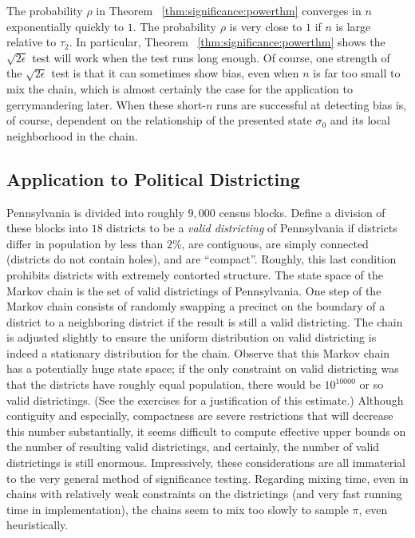 \documentclass[12pt]{article}
\begin{document}
\begin{remark}
    The probability \( \rho \) in Theorem~%
    \ref{thm:significance:powerthm} converges in \( n \) exponentially
    quickly to \( 1 \).  The probability \( \rho \) is very close to \( 1
    \) if \( n \) is large relative to \( \tau_2 \).  In particular,
    Theorem~%
    \ref{thm:significance:powerthm} shows the \( \sqrt{2\epsilon} \) test
    will work when the test runs long enough.  Of course, one strength
    of the \( \sqrt{2\epsilon} \) test is that it can sometimes show
    bias, even when \( n \) is far too small to mix the chain, which is
    almost certainly the case for the application to gerrymandering
    later.  When these short-\( n \) runs are successful at detecting
    bias is, of course, dependent on the relationship of the presented
    state \( \sigma_0 \) and its local neighborhood in the chain.
\end{remark}

\subsection*{Application to Political Districting}

Pennsylvania is divided into roughly \( 9,000 \) census blocks.  Define
a division of these blocks into \( 18 \) districts to be a \emph{valid
districting} of Pennsylvania if districts differ in population by less
than \( 2\% \), are contiguous, are simply connected (districts do not
contain holes), and are ``compact''.  Roughly, this last condition
prohibits districts with extremely contorted structure.  The state space
of the Markov chain is the set of valid districtings of Pennsylvania.
One step of the Markov chain consists of randomly swapping a precinct on
the boundary of a district to a neighboring district if the result is
still a valid districting.  The chain is adjusted slightly to ensure the
uniform distribution on valid districting is indeed a stationary
distribution for the chain.  Observe that this Markov chain has a
potentially huge state space; if the only constraint on valid
districting was that the districts have roughly equal population, there
would be \( 10^{10000} \) or so valid districtings.  (See the exercises
for a justification of this estimate.) Although contiguity and
especially, compactness are severe restrictions that will decrease this
number substantially, it seems difficult to compute effective upper
bounds on the number of resulting valid districtings, and certainly, the
number of valid districtings is still enormous.  Impressively, these
considerations are all immaterial to the very general method of
significance testing.  Regarding mixing time, even in chains with
relatively weak constraints on the districtings (and very fast running
time in implementation), the chains seem to mix too slowly to sample \( \pi \),
even heuristically.
\end{document}
